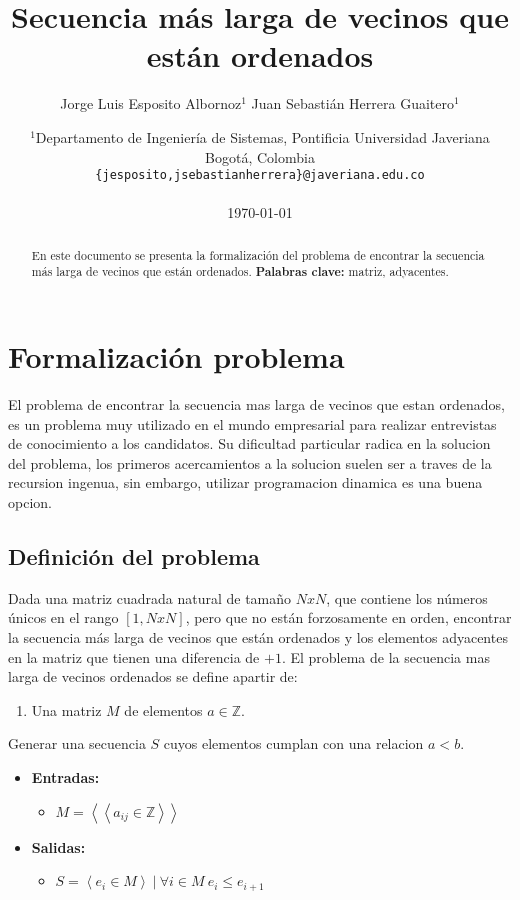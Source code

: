 \documentclass[letter]{article}
\title {Secuencia más larga de vecinos que están ordenados}
\author{ Jorge Luis Esposito Albornoz$^1$  Juan Sebastián Herrera Guaitero$^1$}
\date{
	$^1$Departamento de Ingeniería de Sistemas, Pontificia Universidad Javeriana\\Bogotá,  Colombia \\
	\texttt{\{jesposito,jsebastianherrera\}@javeriana.edu.co}\\~\\
	\today
}
\begin{document}
\maketitle

\begin{abstract}
	En este documento se presenta la formalización del problema de encontrar la secuencia más larga de vecinos que están ordenados.
	\textbf{Palabras clave:} matriz, adyacentes.
\end{abstract}

\tableofcontents

\newpage
\section{Formalización problema}
El problema de encontrar la secuencia mas larga de vecinos que estan ordenados, es un problema muy utilizado en el mundo empresarial para realizar entrevistas de conocimiento
a los candidatos. Su dificultad particular radica en la solucion del problema, los primeros acercamientos a la solucion suelen ser a traves
de la recursion ingenua, sin embargo, utilizar programacion dinamica es una buena opcion.

\subsection{Definición del problema}
Dada una matriz cuadrada natural de tamaño $NxN$, que contiene los números únicos en el rango $[1,NxN]$, pero que no están forzosamente en orden, encontrar la secuencia más larga de vecinos que están ordenados y los elementos adyacentes en la matriz que tienen una diferencia de $+1$.
\break
\break
El problema de la secuencia mas larga de vecinos ordenados se define apartir de:
\begin{enumerate}
	\item Una matriz $M$ de elementos $a\in\mathbb{Z}$.
\end{enumerate}
Generar una secuencia $S$ cuyos elementos cumplan con una relacion $a<b$.
\begin{itemize}
	\item \textbf{Entradas:}
	      \begin{itemize}
		      \item $M = \left<\left<a_{ij}\in \mathbb{Z} \right>\right>$
	      \end{itemize}
	\item \textbf{Salidas:}
	      \begin{itemize}
		      \item $S = \left<e_i \in M\right> ~ | ~ \forall i \in M ~ e_i \le e_{i+1}  $
	      \end{itemize}
\end{itemize}
\end{document}
